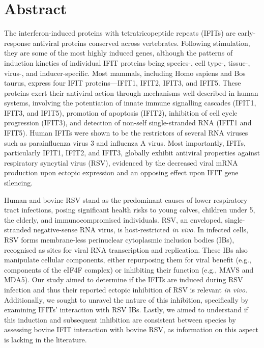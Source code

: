 \chapter{Abstract}
The interferon-induced proteins with tetratricopeptide repeats (IFITs) are early-response antiviral proteins conserved across vertebrates. Following stimulation, they are some of the most highly induced genes, although the patterns of induction kinetics of individual IFIT proteins being species-, cell type-, tissue-, virus-, and inducer-specific. Most mammals, including Homo sapiens and Bos taurus, express four IFIT proteins—IFIT1, IFIT2, IFIT3, and IFIT5. These proteins exert their antiviral action through mechanisms well described in human systems, involving the potentiation of innate immune signalling cascades (IFIT1, IFIT3, and IFIT5), promotion of apoptosis (IFIT2), inhibition of cell cycle progression (IFIT3), and detection of non-self single-stranded RNA (IFIT1 and IFIT5). Human IFITs were shown to be the restrictors of several RNA viruses such as parainfluenza virus 3 and influenza A virus. Most importantly, IFITs, particularly IFIT1, IFIT2, and IFIT3, globally exhibit antiviral properties against respiratory syncytial virus (RSV), evidenced by the decreased viral mRNA production upon ectopic expression and an opposing effect upon IFIT gene silencing.

Human and bovine RSV stand as the predominant causes of lower respiratory tract infections, posing significant health risks to young calves, children under 5, the elderly, and immunocompromised individuals. RSV, an enveloped, single-stranded negative-sense RNA virus, is host-restricted \textit{in vivo}. In infected cells, RSV forms membrane-less perinuclear cytoplasmic inclusion bodies (IBs), recognised as sites for viral RNA transcription and replication. These IBs also manipulate cellular components, either repurposing them for viral benefit (e.g., components of the eIF4F complex) or inhibiting their function (e.g., MAVS and MDA5). Our study aimed to determine if the IFITs are induced during RSV infection and thus their reported ectopic inhibition of RSV is relevant \textit{in vivo}. Additionally, we sought to unravel the nature of this inhibition, specifically by examining IFITs' interaction with RSV IBs. Lastly, we aimed to understand if this induction and subsequent inhibition are consistent between species by assessing bovine IFIT interaction with bovine RSV, as information on this aspect is lacking in the literature.


